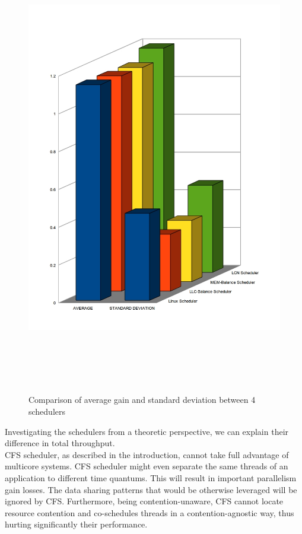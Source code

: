 \documentclass[diploma]{Styles/softlab-thesis}
\begin{document}
\begin{figure}[ht!]
\begin{center}
\hspace*{-3cm}
\includegraphics[width=200mm, height=200mm]{images/avg-stdev-comparison.jpg}
\caption{Comparison of average gain and standard deviation between 4 schedulers \label{overflow}}
\end{center}
\end{figure}

\cleardoublepage

Investigating the schedulers from a theoretic perspective, we can explain their difference in total throughput. \\

CFS scheduler, as described in the introduction, cannot take full advantage of multicore systems. CFS scheduler might even separate the same threads of an application to different time quantums. This will result in important parallelism gain losses. The data sharing patterns that would be otherwise leveraged will be ignored by CFS. Furthermore, being contention-unaware, CFS cannot locate resource contention and co-schedules threads in a contention-agnostic way, thus hurting significantly their performance. \\
\end{document}
